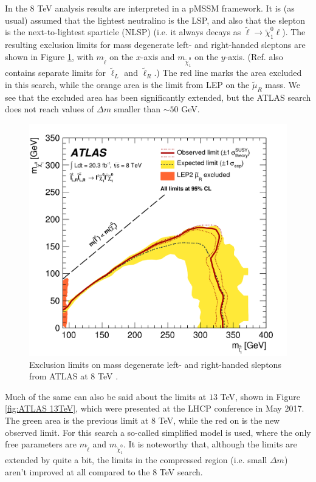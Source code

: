 \documentclass[twocolumn,a4paper,10pt]{article}
\begin{document}
In the $8$ TeV analysis results are interpreted in a pMSSM framework. It is (as usual) assumed that 
the lightest neutralino is the LSP, and also that the slepton is the next-to-lightest sparticle (NLSP) 
(i.e. it always decays as $\tilde{\ell}\rightarrow \tilde{\chi}_1^0 \ell$). The resulting exclusion 
limits for mass degenerate left- and right-handed sleptons are shown in Figure \ref{fig:ATLAS 8TeV}, 
with $m_{\tilde{\ell}}$ on the $x$-axis and $m_{\tilde{\chi}_1^0}$ on the $y$-axis.  
(Ref. \cite{ATLAS:2014} also contains separate limits for $\tilde{\ell}_L$ and $\tilde{\ell}_R$.)   
The red line marks the area excluded in this search, while the orange area is the limit from 
LEP on the $\tilde{\mu}_R$ mass. We see that the excluded area has been significantly extended, but 
the ATLAS search does not reach values of $\Delta m$ smaller than $\sim 50$ GeV.

\begin{figure}
\begin{center}
\includegraphics[scale=0.1]{Run1exclusion.png}
\caption{Exclusion limits on mass degenerate left- and right-handed sleptons from ATLAS at 
$8$ TeV \cite{ATLAS:2014}.}
\label{fig:ATLAS 8TeV}
\end{center}
\end{figure}  

Much of the same can also be said about the limits at $13$ TeV, shown in Figure \ref{fig:ATLAS 13TeV}, 
which were presented at the LHCP conference in May 2017. The green area is the previous limit at $8$ 
TeV, while the red on is the new observed limit. For this search a so-called simplified model is used, 
where the only free parameters are $m_{\tilde{\ell}}$ and $m_{\tilde{\chi}_1^0}$. It is noteworthy 
that, although the limits are extended by quite a bit, the limits in the compressed region (i.e.  
small $\Delta m$) aren't improved at all compared to the $8$ TeV search.        
\end{document}
